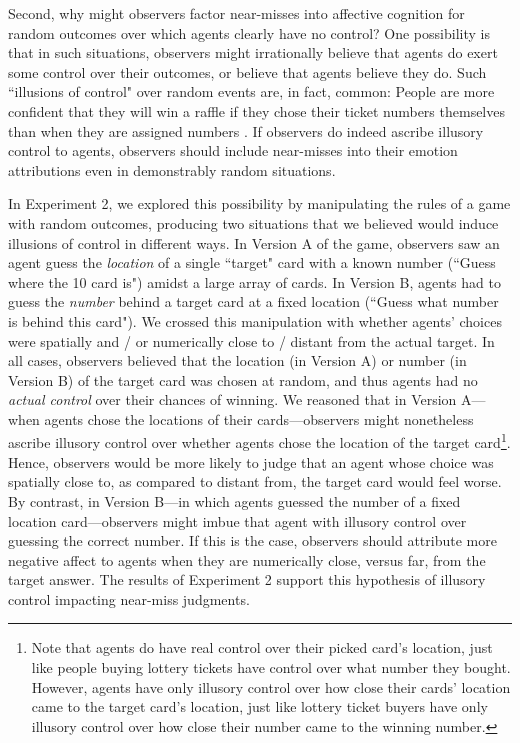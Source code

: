 \documentclass[10pt,letterpaper]{article}
\begin{document}
	Second, why might observers factor near-misses into affective cognition for random outcomes over which agents clearly have no control? One possibility is that in such situations, observers might irrationally believe that agents do exert some control over their outcomes, or believe that agents believe they do.  Such ``illusions of control" over random events are, in fact, common: People are more confident that they will win a raffle if they chose their ticket numbers themselves than when they are assigned numbers \cite{Langer1975, Taylor1988}. If observers do indeed ascribe illusory control to agents, observers should include near-misses into their emotion attributions even in demonstrably random situations.  

	
	In Experiment 2, we explored this possibility by manipulating the rules of a game with random outcomes, producing two situations that we believed would induce illusions of control in different ways. In Version A of the game, observers saw an agent guess the \textit{location} of a single ``target" card with a known number (``Guess where the 10 card is") amidst a large array of cards. In Version B, agents had to guess the \textit{number} behind a target card at a fixed location (``Guess what number is behind this card"). We crossed this manipulation with whether agents' choices were spatially and / or numerically close to / distant from the actual target. In all cases, observers believed that the location (in Version A) or number (in Version B) of the target card was chosen at random, and thus agents had no \textit{actual control} over their chances of winning. We reasoned that in Version A---when agents chose the locations of their cards---observers might nonetheless ascribe illusory control over whether agents chose the location of the target card\footnote{Note that agents do have real control over their picked card's location, just like people buying lottery tickets have control over what number they bought. However, agents have only illusory control over how close their cards' location came to the target card's location, just like lottery ticket buyers have only illusory control over how close their number came to the winning number.}. Hence, observers would be more likely to judge that an agent whose choice was spatially close to, as compared to distant from, the target card would feel worse.  By contrast, in Version B---in which agents guessed the number of a fixed location card---observers might imbue that agent with illusory control over guessing the correct number. If this is the case, observers should attribute more negative affect to agents when they are numerically close, versus far, from the target answer. The results of Experiment 2 support this hypothesis of illusory control impacting near-miss judgments.
\end{document}
